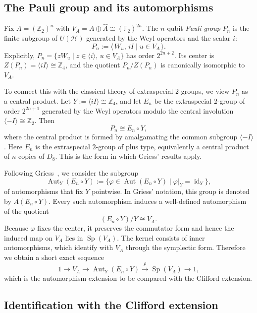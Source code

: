 \documentclass[11pt, reqno]{amsart}
\theoremstyle{definition}
\theoremstyle{remark}
\newcommand{\Z}{\mathbb{Z}}
\newcommand{\HH}{\mathcal{H}}
\newcommand{\F}{\mathbb{F}}
\DeclareMathOperator{\Aut}{Aut}
\DeclareMathOperator{\Sp}{Sp}
\DeclareMathOperator{\id}{id}
\begin{document}
\subsection{The Pauli group and its automorphisms}

Fix $A = (\Z_2)^n$ with $V_A = A \oplus \widehat{A} \cong (\F_2)^{2n}$. The $n$-qubit \emph{Pauli group} $P_n$ is the finite subgroup of $U(\HH)$ generated by the Weyl operators and the scalar $i$:
\begin{equation}\label{eq:pauli-def}
P_n := \langle\, W_u,\, iI \mid u \in V_A \,\rangle.
\end{equation}
Explicitly, $P_n = \{ z W_u \mid z \in \langle i \rangle,\, u \in V_A \}$ has order $2^{2n+2}$. Its center is $Z(P_n) = \langle iI \rangle \cong \Z_4$, and the quotient $P_n/Z(P_n)$ is canonically isomorphic to $V_A$.

To connect this with the classical theory of extraspecial $2$-groups, we view $P_n$ as a central product. Let $Y := \langle iI \rangle \cong \Z_4$, and let $E_n$ be the extraspecial $2$-group of order $2^{2n+1}$ generated by the Weyl operators modulo the central involution $\langle -I \rangle \cong \Z_2$. Then
\[
P_n \cong E_n \circ Y,
\]
where the central product is formed by amalgamating the common subgroup $\langle -I \rangle$. Here $E_n$ is the extraspecial $2$-group of plus type, equivalently a central product of $n$ copies of $D_8$. This is the form in which Griess' results apply.

Following Griess~\cite{Griess1973}, we consider the subgroup
\[
\Aut_Y(E_n \circ Y) := \{ \varphi \in \Aut(E_n \circ Y) \mid \varphi|_Y = \id_Y \},
\]
of automorphisms that fix $Y$ pointwise. In Griess' notation, this group is denoted by $A(E_n \circ Y)$. Every such automorphism induces a well-defined automorphism of the quotient
\[
(E_n \circ Y)/Y \cong V_A.
\]
Because $\varphi$ fixes the center, it preserves the commutator form and hence the induced map on $V_A$ lies in $\Sp(V_A)$. The kernel consists of inner automorphisms, which identify with $V_A$ through the symplectic form. Therefore we obtain a short exact sequence
\begin{equation}\label{eq:autZ-ses}
1 \longrightarrow V_A \longrightarrow \Aut_Y(E_n \circ Y) \xrightarrow{\;\rho\;} \Sp(V_A) \longrightarrow 1,
\end{equation}
which is the automorphism extension to be compared with the Clifford extension.

\subsection{Identification with the Clifford extension}
\end{document}
